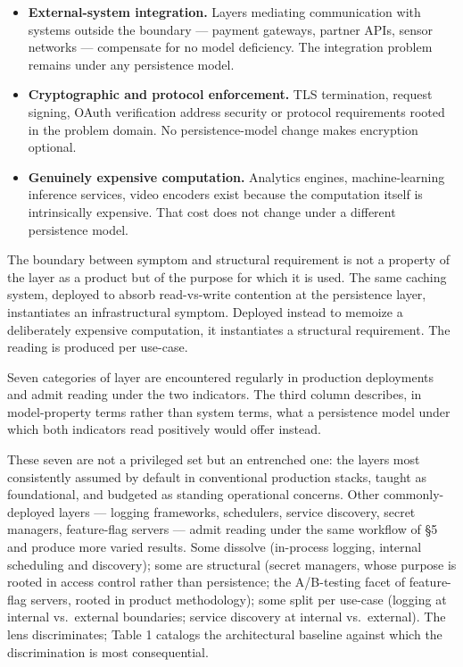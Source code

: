 \documentclass[
]{article}
\providecommand{\tightlist}{%
  \setlength{\itemsep}{0pt}\setlength{\parskip}{0pt}}
\begin{document}
\begin{itemize}
\tightlist
\item
  \textbf{External-system integration.} Layers mediating communication
  with systems outside the boundary --- payment gateways, partner APIs,
  sensor networks --- compensate for no model deficiency. The
  integration problem remains under any persistence model.
\item
  \textbf{Cryptographic and protocol enforcement.} TLS termination,
  request signing, OAuth verification address security or protocol
  requirements rooted in the problem domain. No persistence-model change
  makes encryption optional.
\item
  \textbf{Genuinely expensive computation.} Analytics engines,
  machine-learning inference services, video encoders exist because the
  computation itself is intrinsically expensive. That cost does not
  change under a different persistence model.
\end{itemize}

The boundary between symptom and structural requirement is not a
property of the layer as a product but of the purpose for which it is
used. The same caching system, deployed to absorb read-vs-write
contention at the persistence layer, instantiates an infrastructural
symptom. Deployed instead to memoize a deliberately expensive
computation, it instantiates a structural requirement. The reading is
produced per use-case.

Seven categories of layer are encountered regularly in production
deployments and admit reading under the two indicators. The third column
describes, in model-property terms rather than system terms, what a
persistence model under which both indicators read positively would
offer instead.

These seven are not a privileged set but an entrenched one: the layers
most consistently assumed by default in conventional production stacks,
taught as foundational, and budgeted as standing operational concerns.
Other commonly-deployed layers --- logging frameworks, schedulers,
service discovery, secret managers, feature-flag servers --- admit
reading under the same workflow of §5 and produce more varied results.
Some dissolve (in-process logging, internal scheduling and discovery);
some are structural (secret managers, whose purpose is rooted in access
control rather than persistence; the A/B-testing facet of feature-flag
servers, rooted in product methodology); some split per use-case
(logging at internal vs.~external boundaries; service discovery at
internal vs.~external). The lens discriminates; Table 1 catalogs the
architectural baseline against which the discrimination is most
consequential.
\end{document}
